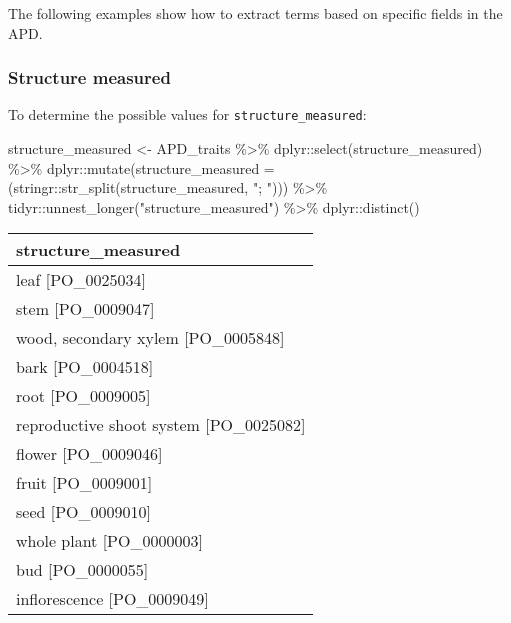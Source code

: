 \documentclass[
  letterpaper,
  DIV=11,
  numbers=noendperiod]{scrartcl}
\newenvironment{Shaded}{\begin{snugshade}}{\end{snugshade}}
\newcommand{\AttributeTok}[1]{\textcolor[rgb]{0.40,0.45,0.13}{#1}}
\newcommand{\FunctionTok}[1]{\textcolor[rgb]{0.28,0.35,0.67}{#1}}
\newcommand{\NormalTok}[1]{\textcolor[rgb]{0.00,0.23,0.31}{#1}}
\newcommand{\OtherTok}[1]{\textcolor[rgb]{0.00,0.23,0.31}{#1}}
\newcommand{\SpecialCharTok}[1]{\textcolor[rgb]{0.37,0.37,0.37}{#1}}
\newcommand{\StringTok}[1]{\textcolor[rgb]{0.13,0.47,0.30}{#1}}
\begin{document}
The following examples show how to extract terms based on specific
fields in the APD.

\hypertarget{structure-measured}{%
\subsubsection{Structure measured}\label{structure-measured}}

To determine the possible values for \texttt{structure\_measured}:

\begin{Shaded}
\begin{Highlighting}[]
\NormalTok{structure\_measured }\OtherTok{\textless{}{-}} 
\NormalTok{  APD\_traits }\SpecialCharTok{\%\textgreater{}\%}
\NormalTok{  dplyr}\SpecialCharTok{::}\FunctionTok{select}\NormalTok{(structure\_measured) }\SpecialCharTok{\%\textgreater{}\%}
\NormalTok{  dplyr}\SpecialCharTok{::}\FunctionTok{mutate}\NormalTok{(}\AttributeTok{structure\_measured =}\NormalTok{ (stringr}\SpecialCharTok{::}\FunctionTok{str\_split}\NormalTok{(structure\_measured, }\StringTok{"; "}\NormalTok{))) }\SpecialCharTok{\%\textgreater{}\%}
\NormalTok{  tidyr}\SpecialCharTok{::}\FunctionTok{unnest\_longer}\NormalTok{(}\StringTok{"structure\_measured"}\NormalTok{) }\SpecialCharTok{\%\textgreater{}\%}
\NormalTok{  dplyr}\SpecialCharTok{::}\FunctionTok{distinct}\NormalTok{()}
\end{Highlighting}
\end{Shaded}

\begin{tabular}[t]{l}
\toprule
structure\_measured\\
\midrule
leaf [PO\_0025034]\\
stem [PO\_0009047]\\
wood, secondary xylem [PO\_0005848]\\
bark [PO\_0004518]\\
root [PO\_0009005]\\
\addlinespace
reproductive shoot system [PO\_0025082]\\
flower [PO\_0009046]\\
fruit [PO\_0009001]\\
seed [PO\_0009010]\\
whole plant [PO\_0000003]\\
\addlinespace
bud [PO\_0000055]\\
inflorescence [PO\_0009049]\\
\bottomrule
\end{tabular}
\end{document}
